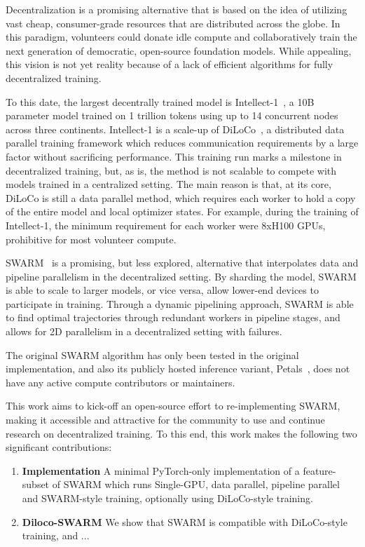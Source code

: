 \documentclass[conference, 10pt]{IEEEtran}
\begin{document}
Decentralization is a promising alternative that is based on the idea of utilizing
vast cheap, consumer-grade resources that are distributed across the globe. In this
paradigm, volunteers could donate idle compute and collaboratively train the next
generation of democratic, open-source foundation models. While appealing, this vision
is not yet reality because of a lack of efficient algorithms for fully decentralized
training.  

To this date, the largest decentrally trained model is
Intellect-1~\cite{intellect1}, a 10B parameter model trained on 1 trillion
tokens using up to 14 concurrent nodes across three continents. Intellect-1 is a
scale-up of DiLoCo~\cite{douillard2023}, a distributed data parallel training
framework which reduces communication requirements by a large factor without
sacrificing performance. This training run marks a milestone in decentralized
training, but, as is, the method is not scalable to compete with models trained
in a centralized setting. The main reason is that, at its core, DiLoCo is still
a data parallel method, which requires each worker to hold a copy of the entire 
model and local optimizer states. For example, during the training of Intellect-1,
the minimum requirement for each worker were 8xH100 GPUs, prohibitive for most 
volunteer compute. 

SWARM~\cite{ryabinin2023} is a promising, but less explored, alternative that
interpolates data and pipeline parallelism in the decentralized setting. By sharding
the model, SWARM is able to scale to larger models, or vice versa, allow
lower-end devices to participate in training. Through a dynamic pipelining approach,
SWARM is able to find optimal trajectories through redundant workers in pipeline stages,
and allows for 2D parallelism in a decentralized setting with failures.

The original SWARM algorithm has only been tested in the original implementation,
and also its publicly hosted inference variant, Petals~\cite{borzunov2023}, does 
not have any active compute contributors or maintainers.

This work aims to kick-off an open-source effort to re-implementing SWARM, making
it accessible and attractive for the community to use and continue research on decentralized training. To this end, this work makes the following two significant contributions:

\begin{enumerate}
  \item \textbf{Implementation} A minimal PyTorch-only implementation of a feature-subset of SWARM which runs Single-GPU, data parallel, pipeline parallel and SWARM-style training, optionally using DiLoCo-style training.
  \item \textbf{Diloco-SWARM} We show that SWARM is compatible with DiLoCo-style training, and ... %
\end{enumerate}
\end{document}
